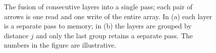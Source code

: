 \begin{figure}[H]
    \caption[Fusing consecutive layers into one pass]{The fusion of consecutive layers into a single
    pass; each pair of arrows is one read and one write of the entire array. In (a)
    each layer is a separate pass to memory; in (b) the layers are grouped by distance
    $j$ and only the last group retains a separate pass. The numbers in the figure
    are illustrative.}
    \label{fig:cpu-layer-fusion}
\end{figure}

